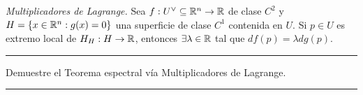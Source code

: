 \E

\begin{theorem}
    \emph{Multiplicadores de Lagrange.} Sea \(f:U^\ab\subseteq \R^n\to \R\) de clase \(C^2\) y \(H=\{x\in \mathbb{R}^n: g(x)=0\}\) una superficie de clase \(C^1\) contenida en \(U\). Si \(p\in U\) es extremo local de \(H_H: H\to \mathbb{R}\), entonces \(\exists \lambda \in \mathbb{R}\) tal que \(df(p) =\lambda dg(p)\).   
\end{theorem} 

\E

\hrule
\begin{exercise}
    Demuestre el Teorema espectral vía Multiplicadores de Lagrange.     
\end{exercise}
\hrule 